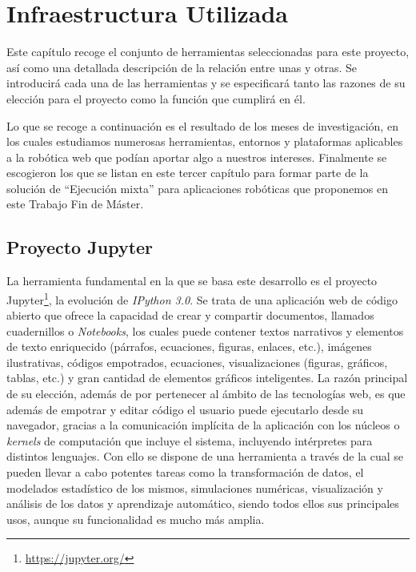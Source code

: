\chapter{Infraestructura Utilizada}

Este capítulo recoge el conjunto de herramientas seleccionadas para este proyecto, así como una detallada descripción de la relación entre unas y otras. Se introducirá cada una de las herramientas y se especificará tanto las razones de su elección para el proyecto como la función que cumplirá en él.

Lo que se recoge a continuación es el resultado de los meses de investigación, en los cuales estudiamos numerosas herramientas, entornos y plataformas aplicables a la robótica web que podían aportar algo a nuestros intereses. Finalmente se escogieron los que se listan en este tercer capítulo para formar parte de la solución de ``Ejecución mixta'' para aplicaciones robóticas que proponemos en este Trabajo Fin de Máster.

\section{Proyecto Jupyter}

La herramienta fundamental en la que se basa este desarrollo es el proyecto Jupyter\footnote{\url{https://jupyter.org/}}, la evolución de \textit{IPython 3.0}. Se trata de una aplicación web de código abierto que ofrece la capacidad de crear y compartir documentos, llamados cuadernillos o \textit{Notebooks}, los cuales puede contener textos narrativos y elementos de texto enriquecido (párrafos, ecuaciones, figuras, enlaces, etc.), imágenes ilustrativas, códigos empotrados, ecuaciones, visualizaciones (figuras, gráficos, tablas, etc.) y gran cantidad de elementos gráficos inteligentes. La razón principal de su elección, además de por pertenecer al ámbito de las tecnologías web, es que además de empotrar y editar código el usuario puede ejecutarlo desde su navegador, gracias a la comunicación implícita de la aplicación con los núcleos o \textit{kernels} de computación que incluye el sistema, incluyendo intérpretes para distintos lenguajes. Con ello se dispone de una herramienta a través de la cual se pueden llevar a cabo potentes tareas como la transformación de datos, el modelados estadístico de los mismos, simulaciones numéricas, visualización y análisis de los datos y aprendizaje automático, siendo todos ellos sus principales usos, aunque su funcionalidad es mucho más amplia.

